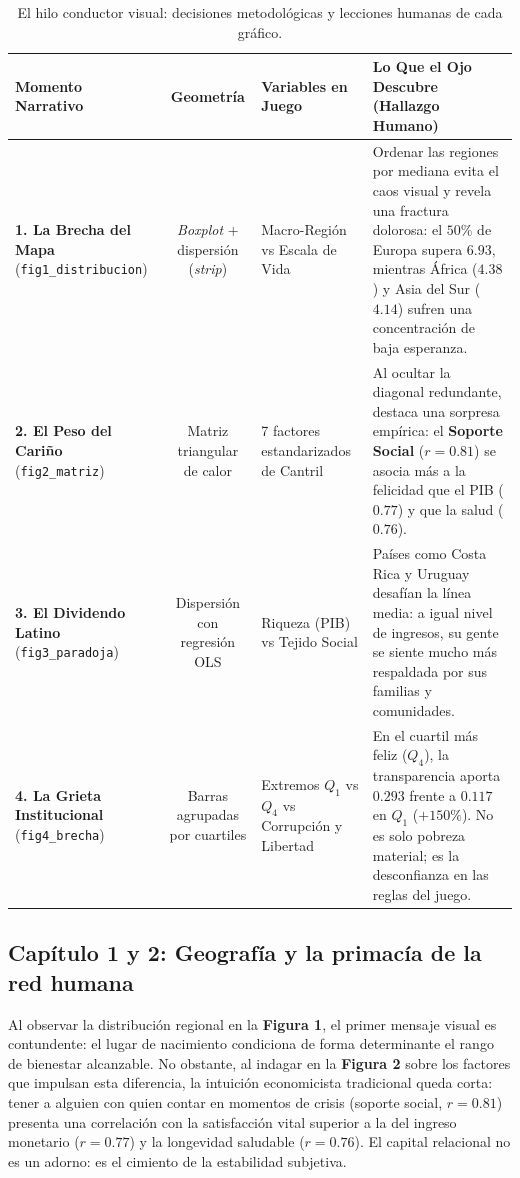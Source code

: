 \documentclass[9.5pt, a4paper]{article}
\begin{document}
\begin{table}[htbp]
    \centering
    \footnotesize
    \caption{El hilo conductor visual: decisiones metodológicas y lecciones humanas de cada gráfico.}
    \label{tab:figuras_seaborn}
    \begin{tabularx}{\textwidth}{p{3.5cm} c p{3.2cm} X}
        \toprule
        \textbf{Momento Narrativo} & \textbf{Geometría} & \textbf{Variables en Juego} & \textbf{Lo Que el Ojo Descubre (Hallazgo Humano)} \\
        \midrule
        \textbf{1. La Brecha del Mapa} (\texttt{fig1\_distribucion}) & \textit{Boxplot} + dispersión (\textit{strip}) & Macro-Región vs Escala de Vida & Ordenar las regiones por mediana evita el caos visual y revela una fractura dolorosa: el $50\%$ de Europa supera $6.93$, mientras África ($4.38$) y Asia del Sur ($4.14$) sufren una concentración de baja esperanza. \\
        \textbf{2. El Peso del Cariño} (\texttt{fig2\_matriz}) & Matriz triangular de calor & 7 factores estandarizados de Cantril & Al ocultar la diagonal redundante, destaca una sorpresa empírica: el \textbf{Soporte Social} ($r = 0.81$) se asocia más a la felicidad que el PIB ($0.77$) y que la salud ($0.76$). \\
        \textbf{3. El Dividendo Latino} (\texttt{fig3\_paradoja}) & Dispersión con regresión OLS & Riqueza (PIB) vs Tejido Social & Países como Costa Rica y Uruguay desafían la línea media: a igual nivel de ingresos, su gente se siente mucho más respaldada por sus familias y comunidades. \\
        \textbf{4. La Grieta Institucional} (\texttt{fig4\_brecha}) & Barras agrupadas por cuartiles & Extremos $Q_1$ vs $Q_4$ vs Corrupción y Libertad & En el cuartil más feliz ($Q_4$), la transparencia aporta $0.293$ frente a $0.117$ en $Q_1$ ($+150\%$). No es solo pobreza material; es la desconfianza en las reglas del juego. \\
        \bottomrule
    \end{tabularx}
\end{table}

\vspace{-0.2cm}

\subsection{Capítulo 1 y 2: Geografía y la primacía de la red humana}
Al observar la distribución regional en la \textbf{Figura 1}, el primer mensaje visual es contundente: el lugar de nacimiento condiciona de forma determinante el rango de bienestar alcanzable. No obstante, al indagar en la \textbf{Figura 2} sobre los factores que impulsan esta diferencia, la intuición economicista tradicional queda corta: tener a alguien con quien contar en momentos de crisis (soporte social, $r = 0.81$) presenta una correlación con la satisfacción vital superior a la del ingreso monetario ($r = 0.77$) y la longevidad saludable ($r = 0.76$). El capital relacional no es un adorno: es el cimiento de la estabilidad subjetiva.
\end{document}
